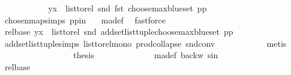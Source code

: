 \begin{isabellebody}
\ \ \ \ \ \ \ \ \isamarkupfalse%
\ \isamarkupfalse%
\ {\isachardoublequoteopen}{\isacharparenleft}{\kern0pt}y{\isacharcomma}{\kern0pt}x{\isacharparenright}{\kern0pt}\ {\isasymin}\ list{\isacharunderscore}{\kern0pt}to{\isacharunderscore}{\kern0pt}rel\ {\isacharparenleft}{\kern0pt}snd\ {\isacharparenleft}{\kern0pt}fst\ {\isacharparenleft}{\kern0pt}choose{\isacharunderscore}{\kern0pt}max{\isacharunderscore}{\kern0pt}blue{\isacharunderscore}{\kern0pt}set\ pp{\isacharparenright}{\kern0pt}{\isacharparenright}{\kern0pt}{\isacharparenright}{\kern0pt}{\isachardoublequoteclose}\isanewline
\ \ \ \ \ \ \ \ \ \ \isamarkupfalse%
\ chosen{\isacharunderscore}{\kern0pt}map{\isacharunderscore}{\kern0pt}simps{\isacharparenleft}{\kern0pt}{}{\isacharparenright}{\kern0pt}\ pp{\isacharunderscore}{\kern0pt}in\ {}\ \isamarkupfalse%
\ ma{\isacharunderscore}{\kern0pt}def\ \isamarkupfalse%
\ fastforce\isanewline
\ \ \ \ \ \ \ \ \isamarkupfalse%
\ \isamarkupfalse%
\ rel{\isacharunderscore}{\kern0pt}base{\isacharcolon}{\kern0pt}\ {\isachardoublequoteopen}{\isacharparenleft}{\kern0pt}y{\isacharcomma}{\kern0pt}x{\isacharparenright}{\kern0pt}\ {\isasymin}\ list{\isacharunderscore}{\kern0pt}to{\isacharunderscore}{\kern0pt}rel\ {\isacharparenleft}{\kern0pt}snd\ {\isacharparenleft}{\kern0pt}add{\isacharunderscore}{\kern0pt}set{\isacharunderscore}{\kern0pt}list{\isacharunderscore}{\kern0pt}tuple{\isacharparenleft}{\kern0pt}choose{\isacharunderscore}{\kern0pt}max{\isacharunderscore}{\kern0pt}blue{\isacharunderscore}{\kern0pt}set\ pp{\isacharparenright}{\kern0pt}{\isacharparenright}{\kern0pt}{\isacharparenright}{\kern0pt}{\isachardoublequoteclose}\isanewline
\ \ \ \ \ \ \ \ \ \ \isamarkupfalse%
\ add{\isacharunderscore}{\kern0pt}set{\isacharunderscore}{\kern0pt}list{\isacharunderscore}{\kern0pt}tuple{\isachardot}{\kern0pt}simps\ list{\isacharunderscore}{\kern0pt}to{\isacharunderscore}{\kern0pt}rel{\isacharunderscore}{\kern0pt}mono\ prod{\isachardot}{\kern0pt}collapse\ snd{\isacharunderscore}{\kern0pt}conv\isanewline
\ \ \ \ \ \ \ \ \ \ \isamarkupfalse%
\ metis\ \isanewline
\ \ \ \ \ \ \ \isanewline
\ \ \ \ \ \ \ \ \isamarkupfalse%
\ {\isacharquery}{\kern0pt}thesis\ \isanewline
\ \ \ \ \ \ \ \ \ \ \isamarkupfalse%
\ \ ma{\isacharunderscore}{\kern0pt}def\ backw\ s{\isacharunderscore}{\kern0pt}in\isanewline
\ \ \ \ \ \ \ \ \ \ \isamarkupfalse%
\ rel{\isacharunderscore}{\kern0pt}base\ \ \isamarkupfalse%

\end{isabellebody}
